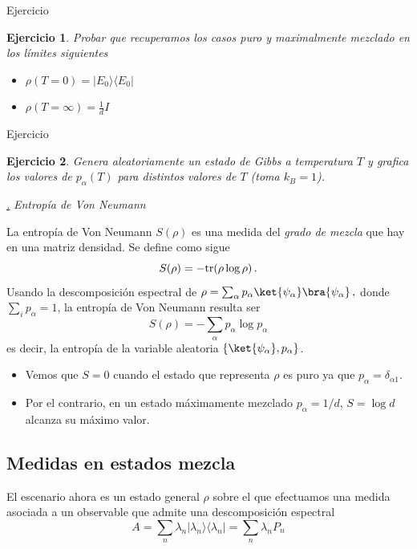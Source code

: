 \documentclass[a4paper,11pt]{book} %
\newtheorem{ejercicio_contador}{Ejercicio}
\newcommand{\Ejercicio}[1]{
		\begin{mybox_gray}{Ejercicio} 
			\begin{ejercicio_contador}
				 #1 
			\end{ejercicio_contador} 
		\end{mybox_gray}
	}
\numberwithin{equation}{chapter}
\newcommand{\ketbra}[2]{| #1\rangle \! \langle #2|}
\def\subsubiContadorIt{\par\addtocounter{subsubsection}{1}\underline{\it\thesubsubsection.}\hskip0.5cm \setcounter{subsubsubsectionIt}{0}}
\newcommand{\SubsubiIt}[1]{
		\subsubiContadorIt \textit{#1}
	}
\newcounter{subsubsubsectionIt}[subsubsection]
\begin{document}
	\Ejercicio{
	Probar  que recuperamos los casos puro y maximalmente mezclado en los límites siguientes
	\begin{itemize}
		\item $\rho(T=0) = \ketbra{E_0}{E_0}$
		\item $\rho(T=\infty) = \frac{1}{d} I$
	\end{itemize}
	}

	\Ejercicio{
	Genera aleatoriamente un estado de Gibbs a temperatura $T$ y grafica los valores de $p_\alpha(T)$
    para distintos valores de $T$ (toma $k_B=1$).
	}
	
			\SubsubiIt{Entropía de Von Neumann}

La entropía de Von Neumann $S(\rho)$ es una medida del \textit{grado de mezcla} que hay en una matriz densidad. Se define  como sigue
	\begin{equation}
	S(\rho) = -{\rm tr} (\rho \log \rho )\, .
	\end{equation}
Usando la descomposición espectral de $\rho = \sum_\alpha p_\alpha \ket{\psi_\alpha}\bra{\psi_\alpha}  \, ,$ donde  $\sum_i p_\alpha =1$, la entropía de Von Neumann resulta ser 
	\begin{equation}
	S(\rho) = -\sum_\alpha p_\alpha \log p_\alpha
	\end{equation}
es decir, la entropía de la variable aleatoria $\{\ket{\psi_\alpha},p_\alpha\}$.

\begin{itemize}
	\item Vemos que $S=0$ cuando el estado que representa $\rho$ es puro ya que $p_\alpha = \delta_{\alpha1}$. 
	\item Por el contrario, en un estado máximamente mezclado $p_\alpha= 1/d$, $S = \log d$ alcanza su máximo valor.
\end{itemize}






		\subsection{Medidas en estados mezcla}

El escenario ahora es un estado general $\rho$ sobre el que efectuamos una medida asociada a un observable que admite una descomposición espectral
	\begin{equation}
	A = \sum_n \lambda_n \ketbra{\lambda_n}{\lambda_n} = \sum_n \lambda_n P_n
	\end{equation}
\end{document}
